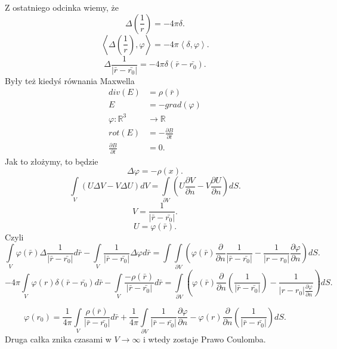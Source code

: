 \documentclass[../main.tex]{subfiles}
\begin{document}
Z ostatniego odcinka wiemy, że
\[
    \Delta\left( \frac{1}{r} \right) = - 4\pi \delta
.\]
\[
    \left< \Delta \left( \frac{1}{r} \right) , \varphi \right> = -4 \pi \left<\delta, \varphi \right>
.\]
\[
    \Delta \frac{1}{\left| \bar{r} - \bar{r_0} \right| } = -4 \pi \delta (\bar{r} - \bar{r_0})
.\]
Były też kiedyś równania Maxwella
\begin{align*}
    div(E) &= \rho(\bar{r})\\
    E &= - grad(\varphi)\\
    \varphi : \mathbb{R}^3 &\to \mathbb{R}\\
    rot(E) &= -\frac{\partial B}{\partial t}\\
    \frac{\partial B}{\partial t} &= 0
.\end{align*}
Jak to złożymy, to będzie
\[
    \Delta \varphi = -\rho(x)
.\]
\[
    \int\limits_{V} \left( U\Delta V - V \Delta U \right) dV = \int\limits_{\partial V}\left( U \frac{\partial V}{\partial n} - V \frac{\partial U}{\partial n}  \right)dS
.\]
\[
    V = \frac{1}{\left| \bar{r} - \bar{r_0} \right| }
.\]
\[
    U = \varphi(\bar{r})
.\]
Czyli
\[
    \int\limits_{V}\varphi(\bar{r}) \Delta \frac{1}{\left| \bar{r} - \bar{r_0} \right| }d\bar{r} - \int\limits_{V}\frac{1}{\left| \bar{r} - \bar{r_0} \right| }\Delta \varphi d\bar{r} = \int\int\limits_{\partial V}\left(\varphi(\bar{r})\frac{\partial }{\partial n} \frac{1}{\left| \bar{r} - \bar{r_0} \right|} - \frac{1}{\left| r - r_0 \right|}\frac{\partial \varphi}{\partial n} \right) dS
.\]
\[
    -4\pi \int\limits_V \varphi(r)\delta(\bar{r} - \bar{r_0})d\bar{r} - \int\limits_V \frac{-\rho(\bar{r})}{\left| \bar{r} - \bar{r_0} \right| }d\bar{r} = \int\limits_{\partial V}\left(\varphi\left( \bar{r} \right) \frac{\partial }{\partial n} \left( \frac{1}{\left| \bar{r} - \bar{r_0} \right| } \right) - \frac{1}{\left| r-r_0 \right| \frac{\partial \varphi}{\partial n} }\right) dS
.\]

\[
    \varphi(r_0) = \frac{1}{4\pi}\int\limits_V \frac{\rho(\bar{r})}{\left| \bar{r} - \bar{r_0} \right| }d\bar{r} + \frac{1}{4\pi} \int\limits_{\partial V}\frac{1}{\left| \bar{r} - \bar{r_0} \right|} \frac{\partial \varphi}{\partial n} - \varphi(r)\frac{\partial }{\partial n} \left( \frac{1}{\left| \bar{r} - \bar{r_0} \right| } \right)dS
.\]
Druga całka znika czasami w $V\to \infty$ i wtedy zostaje Prawo Coulomba.
\end{document}
